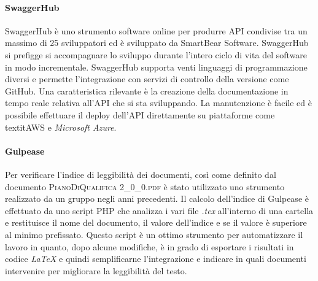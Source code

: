		\paragraph{SwaggerHub}
		SwaggerHub è uno strumento software online per produrre API condivise tra un massimo di 25 sviluppatori ed è sviluppato da SmartBear Software. SwaggerHub si prefigge si accompagnare lo sviluppo durante l'intero ciclo di vita del software in modo incrementale. SwaggerHub supporta venti linguaggi di programmazione diversi e permette l'integrazione con servizi di controllo della versione come GitHub. 
		Una caratteristica rilevante è la creazione della documentazione in tempo reale relativa all'API che si sta sviluppando. La manutenzione è facile ed è possibile effettuare il deploy dell'API direttamente su piattaforme come \\textit{AWS} e \textit{Microsoft Azure}.
			
		
		\paragraph{Gulpease}
		Per verificare l'indice di leggibilità dei documenti, così come definito dal documento \textsc{PianoDiQualifica 2\_0\_0.pdf} è stato utilizzato uno strumento realizzato da un gruppo negli anni precedenti. Il calcolo dell'indice di Gulpease è effettuato da uno script PHP che analizza i vari file \textit{.tex} all'interno di una cartella e restituisce il nome del documento, il valore dell'indice e se il valore è superiore al minimo prefissato. 
		Questo script è un ottimo strumento per automatizzare il lavoro in quanto, dopo alcune modifiche, è in grado di esportare i risultati in codice \textit{\LaTeX{}} e quindi semplificarne l'integrazione e indicare in quali documenti intervenire per migliorare la leggibilità del testo.
